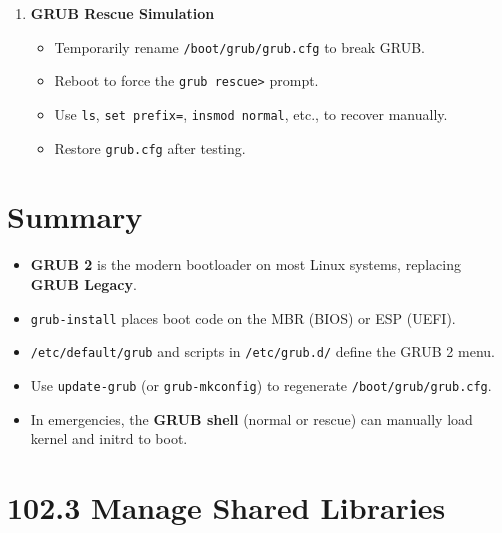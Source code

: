 \documentclass[12pt,a4paper]{report}
\begin{document}
\begin{enumerate}
    \item \textbf{GRUB Rescue Simulation}  
    \begin{itemize}
        \item Temporarily rename \texttt{/boot/grub/grub.cfg} to break GRUB.  
        \item Reboot to force the \texttt{grub rescue>} prompt.  
        \item Use \texttt{ls}, \texttt{set prefix=}, \texttt{insmod normal}, etc., to recover manually.  
        \item Restore \texttt{grub.cfg} after testing.
    \end{itemize}
\end{enumerate}



\section*{Summary}

\begin{itemize}
    \item \textbf{GRUB 2} is the modern bootloader on most Linux systems, replacing \textbf{GRUB Legacy}.  
    \item \texttt{grub-install} places boot code on the MBR (BIOS) or ESP (UEFI).  
    \item \texttt{/etc/default/grub} and scripts in \texttt{/etc/grub.d/} define the GRUB 2 menu.  
    \item Use \texttt{update-grub} (or \texttt{grub-mkconfig}) to regenerate \texttt{/boot/grub/grub.cfg}.  
    \item In emergencies, the \textbf{GRUB shell} (normal or rescue) can manually load kernel and initrd to boot.  
\end{itemize}










\newpage

\section*{102.3 Manage Shared Libraries}
\end{document}
